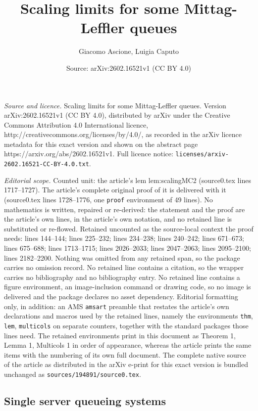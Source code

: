 \documentclass[10pt,a4paper]{amsart}
\title{Scaling limits for some Mittag-Leffler queues}
\author{Giacomo Ascione, Luigia Caputo}
\date{Source: arXiv:2602.16521v1 (CC BY 4.0)}
\begin{document}
\maketitle

\noindent\emph{Source and licence.} Scaling limits for some Mittag-Leffler queues. Version arXiv:2602.16521v1 (CC BY 4.0), distributed by arXiv under the Creative Commons Attribution 4.0 International licence, http://creativecommons.org/licenses/by/4.0/, as recorded in the arXiv licence metadata for this exact version and shown on the abstract page https://arxiv.org/abs/2602.16521v1. Full licence notice: \texttt{licenses/arxiv-2602.16521-CC-BY-4.0.txt}.\par\smallskip

\noindent\textit{Editorial scope.} Counted unit: the article's lem lem:scalingMC2 (source0.tex lines 1717--1727). The article's complete original proof of it is delivered with it (source0.tex lines 1728--1776, one \texttt{proof} environment of 49 lines). No mathematics is written, repaired or re-derived: the statement and the proof are the article's own lines, in the article's own notation, and no retained line is substituted or re-flowed.  Retained uncounted as the source-local context the proof needs: lines 144--144; lines 225--232; lines 234--238; lines 240--242; lines 671--673; lines 675--688; lines 1713--1715; lines 2026--2033; lines 2047--2063; lines 2095--2100; lines 2182--2200.  Nothing was omitted from any retained span, so the package carries no omission record.  No retained line contains a citation, so the wrapper carries no bibliography and no bibliography entry.  No retained line contains a figure environment, an image-inclusion command or drawing code, so no image is delivered and the package declares no asset dependency.  Editorial formatting only, in addition: an AMS \texttt{amsart} preamble that restates the article's own declarations and macros used by the retained lines, namely the environments \texttt{thm}, \texttt{lem}, \texttt{multicols} on separate counters, together with the standard packages those lines need.  The retained environments print in this document as Theorem 1, Lemma 1, Multicols 1 in order of appearance, whereas the article prints the same items with the numbering of its own full document.  The complete native source of the article as distributed in the arXiv e-print for this exact version is bundled unchanged as \texttt{sources/194891/source0.tex}.
\subsection{Single server queueing systems}\label{subs:ssqs}
\end{document}
